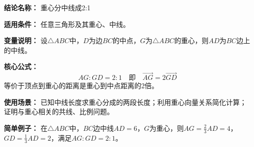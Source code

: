 \textbf{结论名称：} 重心分中线成2:1

\textbf{适用条件：} 任意三角形及其重心、中线。

\textbf{变量说明：} 设$\triangle ABC$中，$D$为边$BC$的中点，$G$为$\triangle ABC$的重心，则$AD$为$BC$边上的中线。

\textbf{核心公式：}
\[
\boxed{AG:GD = 2:1 \quad \text{即} \quad \overrightarrow{AG} = 2\overrightarrow{GD}}
\]
等价于顶点到重心的距离是重心到中点距离的2倍。

\textbf{使用场景：} 已知中线长度求重心分成的两段长度；利用重心向量关系简化计算；证明与重心相关的共线、比例问题。

\textbf{简单例子：} 在$\triangle ABC$中，$BC$边中线$AD=6$，$G$为重心，则$AG = \frac{2}{3}AD = 4$，$GD = \frac{1}{3}AD = 2$，满足$AG:GD = 2:1$。